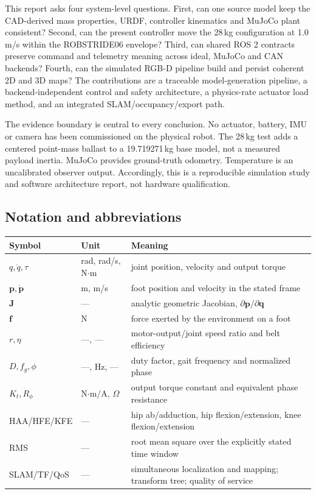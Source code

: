 \documentclass[11pt,a4paper]{article}
\begin{document}
This report asks four system-level questions. First, can one source model keep
the CAD-derived mass properties, URDF, controller kinematics and MuJoCo plant
consistent? Second, can the present controller move the 28\,kg configuration at
1.0\,m/s within the ROBSTRIDE06 envelope? Third, can shared ROS 2 contracts
preserve command and telemetry meaning across ideal, MuJoCo and CAN backends?
Fourth, can the simulated RGB-D pipeline build and persist coherent 2D and 3D
maps? The contributions are a traceable model-generation pipeline, a
backend-independent control and safety architecture, a physics-rate actuator
load method, and an integrated SLAM/occupancy/export path.

The evidence boundary is central to every conclusion. No actuator, battery,
IMU or camera has been commissioned on the physical robot. The 28\,kg test
adds a centered point-mass ballast to a 19.719271\,kg base model, not a measured
payload inertia. MuJoCo provides ground-truth odometry. Temperature is an
uncalibrated observer output. Accordingly, this is a reproducible simulation
study and software architecture report, not hardware qualification.

\subsection{Notation and abbreviations}

\begin{center}\small
\begin{tabular}{@{}llp{}@{}}
\toprule
\textbf{Symbol} & \textbf{Unit} & \textbf{Meaning} \\
\midrule
$q,\dot q,\tau$ & rad, rad/s, N$\cdot$m & joint position, velocity and output torque \\
$\mathbf p,\dot{\mathbf p}$ & m, m/s & foot position and velocity in the stated frame \\
$\mathbf J$ & --- & analytic geometric Jacobian, $\partial\mathbf p/\partial\mathbf q$ \\
$\mathbf f$ & N & force exerted by the environment on a foot \\
$r,\eta$ & ---, --- & motor-output/joint speed ratio and belt efficiency \\
$D,f_g,\phi$ & ---, Hz, --- & duty factor, gait frequency and normalized phase \\
$K_t,R_\phi$ & N$\cdot$m/A, $\Omega$ & output torque constant and equivalent phase resistance \\
HAA/HFE/KFE & --- & hip ab/adduction, hip flexion/extension, knee flexion/extension \\
RMS & --- & root mean square over the explicitly stated time window \\
SLAM/TF/QoS & --- & simultaneous localization and mapping; transform tree; quality of service \\
\bottomrule
\end{tabular}
\end{center}
\end{document}
